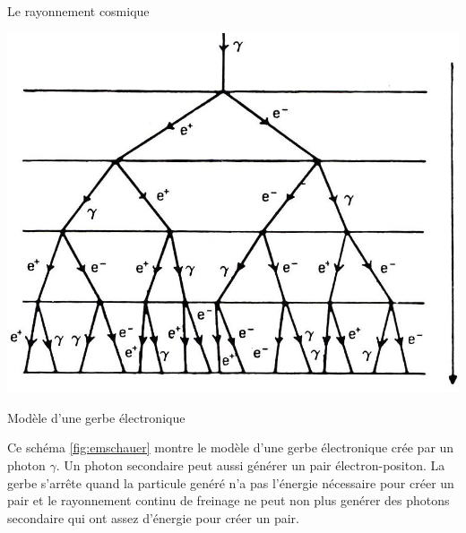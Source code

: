 \documentclass[a4paper,11pt,liststotocnumbered,bibtotocnumbered]{scrartcl}
\begin{document}
\begin{section}{Le rayonnement cosmique}
    \begin{figurehere}
     \begin{minipage}{0.45\textwidth}
      \center 
     \includegraphics[width=\textwidth]{bilder/emschauer.jpg}   
     \caption{Modèle d'une gerbe électronique}   
     \label{fig:emschauer}  
     \end{minipage}
     \begin{minipage}{0.5\textwidth}
      Ce schéma \ref{fig:emschauer} montre le modèle d'une gerbe électronique crée par un photon $\gamma$. Un photon secondaire peut aussi générer un pair électron-positon. La gerbe s'arrête quand la particule genéré n'a pas l'énergie nécessaire pour créer un pair et le rayonnement continu de freinage ne peut non plus genérer des photons secondaire qui ont assez d'énergie pour créer un pair.
     \end{minipage}
    \end{figurehere}
 

\end{section}
\end{document}
